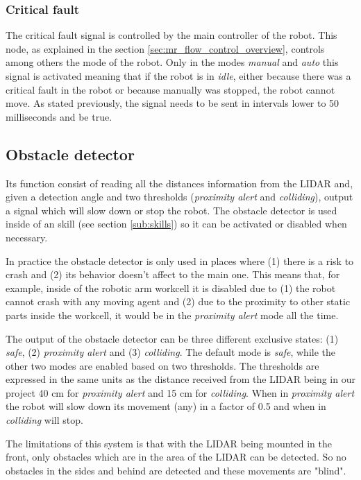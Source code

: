 		\subsubsection{Critical fault} %
		\label{ssub:mr_critical_fault}
		The critical fault signal is controlled by the main controller of the robot.
		This node, as explained in the section \ref{sec:mr_flow_control_overview}, controls among others the mode of the robot.
		Only in the modes \emph{manual} and \emph{auto} this signal is activated meaning that if the robot is in \emph{idle}, either because there was a critical fault in the robot or because manually was stopped, the robot cannot move.
		As stated previously, the signal needs to be sent in intervals lower to 50 milliseconds and be true.

	\subsection{Obstacle detector} %
	\label{sub:mr_obstacle_detector}
	Its function consist of reading all the distances information from the LIDAR and, given a detection angle and two thresholds (\emph{proximity alert} and \emph{colliding}), output a signal which will slow down or stop the robot.
	The obstacle detector is used inside of an skill (see section \ref{sub:skills}) so it can be activated or disabled when necessary.

	In practice the obstacle detector is only used in places where (1) there is a risk to crash and (2) its behavior doesn't affect to the main one.
	This means that, for example, inside of the robotic arm workcell it is disabled due to (1) the robot cannot crash with any moving agent and (2) due to the proximity to other static parts inside the workcell, it would be in the \emph{proximity alert} mode all the time. 


	The output of the obstacle detector can be three different exclusive states: (1) \emph{safe}, (2) \emph{proximity alert} and (3) \emph{colliding}. 
	The default mode is \emph{safe}, while the other two modes are enabled based on two thresholds.
	The thresholds are expressed in the same units as the distance received from the LIDAR being in our project 40 cm for \emph{proximity alert} and 15 cm for \emph{colliding}.
	When in \emph{proximity alert} the robot will slow down its movement (any) in a factor of 0.5 and when in \emph{colliding} will stop.

	The limitations of this system is that with the LIDAR being mounted in the front, only obstacles which are in the area of the LIDAR can be detected.
	So no obstacles in the sides and behind are detected and these movements are "blind".
